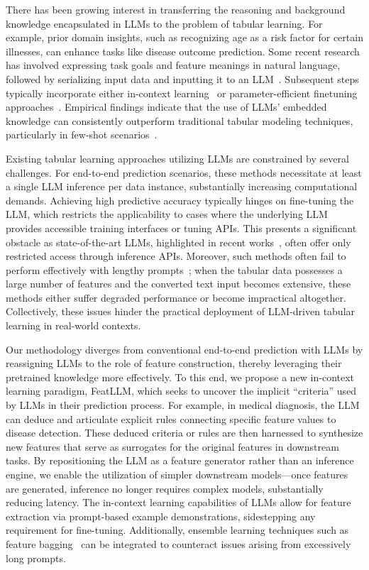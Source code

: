 There has been growing interest in transferring the reasoning and background knowledge encapsulated in LLMs to the problem of tabular learning. For example, prior domain insights, such as recognizing age as a risk factor for certain illnesses, can enhance tasks like disease outcome prediction. Some recent research has involved expressing task goals and feature meanings in natural language, followed by serializing input data and inputting it to an LLM~\cite{dinh2022lift,wang2023anypredict}. Subsequent steps typically incorporate either in-context learning~\cite{nam2023semi} or parameter-efficient finetuning approaches~\cite{dinh2022lift,hegselmann2023tabllm}. Empirical findings indicate that the use of LLMs’ embedded knowledge can consistently outperform traditional tabular modeling techniques, particularly in few-shot scenarios~\cite{hegselmann2023tabllm}.

Existing tabular learning approaches utilizing LLMs are constrained by several challenges. For end-to-end prediction scenarios, these methods necessitate at least a single LLM inference per data instance, substantially increasing computational demands. Achieving high predictive accuracy typically hinges on fine-tuning the LLM, which restricts the applicability to cases where the underlying LLM provides accessible training interfaces or tuning APIs. This presents a significant obstacle as state-of-the-art LLMs, highlighted in recent works~\cite{anil2023palm,openai2023gpt4}, often offer only restricted access through inference APIs. Moreover, such methods often fail to perform effectively with lengthy prompts~\cite{liu2023lost}; when the tabular data possesses a large number of features and the converted text input becomes extensive, these methods either suffer degraded performance or become impractical altogether. Collectively, these issues hinder the practical deployment of LLM-driven tabular learning in real-world contexts.

Our methodology diverges from conventional end-to-end prediction with LLMs by reassigning LLMs to the role of feature construction, thereby leveraging their pretrained knowledge more effectively. To this end, we propose a new in-context learning paradigm, \textsf{FeatLLM}, which seeks to uncover the implicit “criteria” used by LLMs in their prediction process. For example, in medical diagnosis, the LLM can deduce and articulate explicit rules connecting specific feature values to disease detection. These deduced criteria or rules are then harnessed to synthesize new features that serve as surrogates for the original features in downstream tasks. By repositioning the LLM as a feature generator rather than an inference engine, we enable the utilization of simpler downstream models—once features are generated, inference no longer requires complex models, substantially reducing latency. The in-context learning capabilities of LLMs allow for feature extraction via prompt-based example demonstrations, sidestepping any requirement for fine-tuning. Additionally, ensemble learning techniques such as feature bagging~\cite{breiman2001random} can be integrated to counteract issues arising from excessively long prompts.

